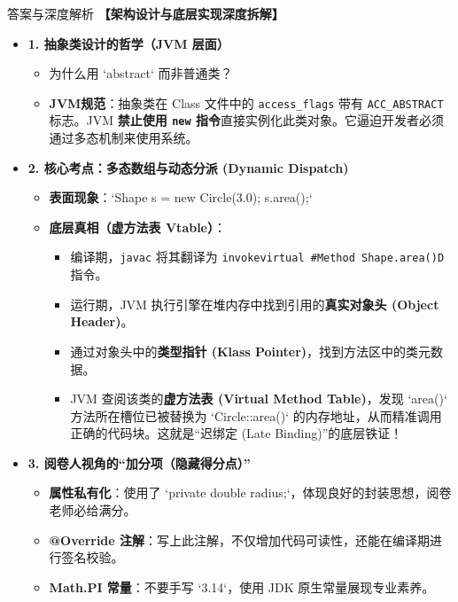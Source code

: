 \documentclass[12pt, a4paper]{ctexart}
\begin{document}
\begin{enumerate}[label=\textbf{\arabic*.}]
\begin{bluebox}{答案与深度解析}
		      \textbf{【架构设计与底层实现深度拆解】}
		      \begin{itemize}[leftmargin=*, nosep]

			      \item \textbf{1. 抽象类设计的哲学（JVM 层面）}
			            \begin{itemize}
				            \item 为什么用 `abstract` 而非普通类？
				            \item \textbf{JVM规范}：抽象类在 Class 文件中的 \texttt{access\_flags} 带有 \texttt{ACC\_ABSTRACT} 标志。JVM \textbf{禁止使用 \texttt{new} 指令}直接实例化此类对象。它逼迫开发者必须通过多态机制来使用系统。
			            \end{itemize}

			      \item \textbf{2. 核心考点：多态数组与动态分派 (Dynamic Dispatch)}
			            \begin{itemize}
				            \item \textbf{表面现象}：`Shape s = new Circle(3.0); s.area();`
				            \item \textbf{底层真相（虚方法表 Vtable）}：
				                  \begin{itemize}
					                  \item 编译期，\texttt{javac} 将其翻译为 \texttt{invokevirtual \#Method Shape.area()D}指令。
					                  \item 运行期，JVM 执行引擎在堆内存中找到引用的\textbf{真实对象头 (Object Header)}。
					                  \item 通过对象头中的\textbf{类型指针 (Klass Pointer)}，找到方法区中的类元数据。
					                  \item JVM 查阅该类的\textbf{虚方法表 (Virtual Method Table)}，发现 `area()` 方法所在槽位已被替换为 `Circle::area()` 的内存地址，从而精准调用正确的代码块。这就是“迟绑定 (Late Binding)”的底层铁证！
				                  \end{itemize}
			            \end{itemize}

			      \item \textbf{3. 阅卷人视角的“加分项（隐藏得分点）”}
			            \begin{itemize}
				            \item \textbf{属性私有化}：使用了 `private double radius;`，体现良好的封装思想，阅卷老师必给满分。
				            \item \textbf{@Override 注解}：写上此注解，不仅增加代码可读性，还能在编译期进行签名校验。
				            \item \textbf{Math.PI 常量}：不要手写 `3.14`，使用 JDK 原生常量展现专业素养。
			            \end{itemize}
		      \end{itemize}
	      \end{bluebox}
\end{enumerate}
\end{document}
